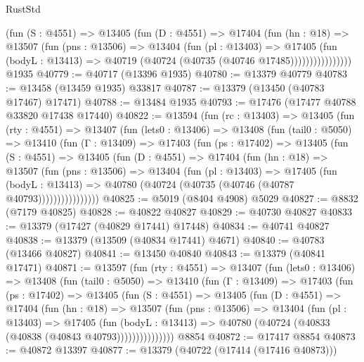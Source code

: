 \begin{lexlean}{RustStd}
\begin{coremodule}
                  (fun (S : @4551) =>
                  @13405
                    (fun (D : @4551) =>
                    @17404
                      (fun (hn : @18) =>
                      @13507
                        (fun (pns : @13506) =>
                        @13404
                          (fun (pl : @13403) =>
                          @17405
                            (fun (bodyL : @13413) =>
                            @40719 (@40724 (@40735 (@40746 @17485))))))))))))))))
    @1935
@40779 := @40717 (@13396 @1935)
@40780 := @13379 @40779
@40783 := @13458 (@13459 @1935) @33817
@40787 := @13379 (@13450 (@40783 @17467) @17471)
@40788 := @13484 @1935
@40793 := @17476 (@17477 @40788 @33820 @17438 @17440)
@40822 := @13594
    (fun (rc : @13403) =>
    @13405
      (fun (rty : @4551) =>
      @13407
        (fun (lets0 : @13406) =>
        @13408
          (fun (tail0 : @5050) =>
          @13410
            (fun (Γ : @13409) =>
            @17403
              (fun (ps : @17402) =>
              @13405
                (fun (S : @4551) =>
                @13405
                  (fun (D : @4551) =>
                  @17404
                    (fun (hn : @18) =>
                    @13507
                      (fun (pns : @13506) =>
                      @13404
                        (fun (pl : @13403) =>
                        @17405
                          (fun (bodyL : @13413) =>
                          @40780 (@40724 (@40735 (@40746 (@40787 @40793))))))))))))))))
@40825 := @5019 (@8404 @4908) @5029
@40827 := @8832 (@7179 @40825)
@40828 := @40822 @40827
@40829 := @40730 @40827
@40833 := @13379 (@17427 (@40829 @17441) @17448)
@40834 := @40741 @40827
@40838 := @13379 (@13509 (@40834 @17441) @4671)
@40840 := @40783 (@13466 @40827)
@40841 := @13450 @40840
@40843 := @13379 (@40841 @17471)
@40871 := @13597
    (fun (rty : @4551) =>
    @13407
      (fun (lets0 : @13406) =>
      @13408
        (fun (tail0 : @5050) =>
        @13410
          (fun (Γ : @13409) =>
          @17403
            (fun (ps : @17402) =>
            @13405
              (fun (S : @4551) =>
              @13405
                (fun (D : @4551) =>
                @17404
                  (fun (hn : @18) =>
                  @13507
                    (fun (pns : @13506) =>
                    @13404
                      (fun (pl : @13403) =>
                      @17405
                        (fun (bodyL : @13413) =>
                        @40780 (@40724 (@40833 (@40838 (@40843 @40793)))))))))))))))
    @8854
@40872 := @17417 @8854
@40873 := @40872 @13397
@40877 := @13379 (@40722 (@17414 (@17416 @40873)))

\end{coremodule}
\end{lexlean}
